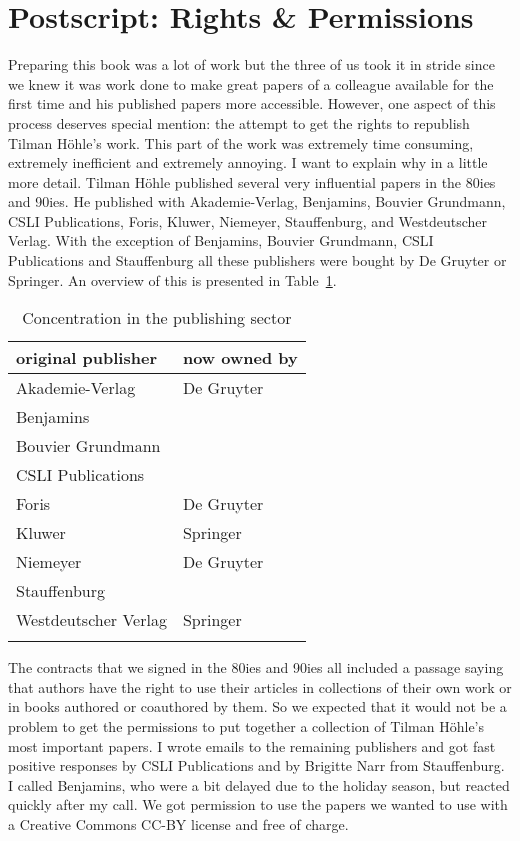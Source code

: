 \section*{Postscript: Rights \& Permissions}
\label{page-postscript}
\begin{refsection}

Preparing this book was a lot of work but the three of us took it in stride since we knew it was work done to make great papers of a colleague available for the first time and his published papers more accessible. However, one aspect of this process deserves special mention: the
attempt to get the rights to republish Tilman Höhle's work. This part of the work was extremely time consuming, extremely inefficient and extremely annoying. I want to explain why in
a little more detail. Tilman Höhle published several very influential papers in the 80ies and
90ies. He published with 
Akademie-Verlag,
Benjamins,
Bouvier Grundmann,
CSLI Publications, 
Foris, 
Kluwer, 
Niemeyer, 
Stauffenburg, and
Westdeutscher Verlag. With the exception of Benjamins, Bouvier Grundmann, CSLI Publications and Stauffenburg all these
publishers were bought by De Gruyter or Springer. An overview of this is presented in Table~\ref{tab-publishers-then-and-now}.

\begin{table}
\begin{tabular}{ll}
\lsptoprule
original publisher & now owned by\\
\midrule
Akademie-Verlag      & De Gruyter\\
Benjamins            & \\
Bouvier Grundmann & \\
CSLI Publications    & \\
Foris                & De Gruyter\\
Kluwer               & Springer\\
Niemeyer             & De Gruyter\\
Stauffenburg         & \\
Westdeutscher Verlag & Springer\\
\lspbottomrule
\end{tabular}
\caption{\label{tab-publishers-then-and-now}Concentration in the publishing sector}
\end{table}

The contracts that we signed in the 80ies and 90ies all included a passage saying that authors have
the right to use their articles in collections of their own work or in books authored or coauthored
by them. So we expected that it would not be a problem to get the permissions to put together a
collection of Tilman Höhle's most important papers. I wrote emails to the remaining publishers and
got fast positive responses by CSLI Publications and by Brigitte Narr from Stauffenburg. I called Benjamins, who
were a bit delayed due to the holiday season, but reacted quickly after my call. We got permission
to use the papers we wanted to use with a Creative Commons CC-BY license and free of charge. 


\end{refsection}

